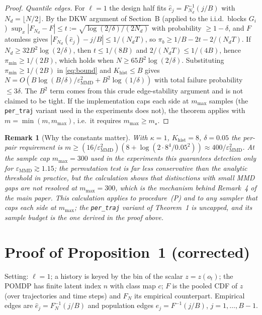 \documentclass[10pt]{article}
\newtheorem{remark}{Remark}[section]
\newcommand{\epsMMD}{\varepsilon_{\mathrm{MMD}}}
\newcommand{\Khist}{K_{\mathrm{hist}}}
\begin{document}
\begin{proof}
\emph{Quantile edges.}  For $\ell=1$ the design half fits $\hat e_j=F_{N_d}^{-1}(j/B)$ with $N_d=\lfloor
N/2\rfloor$.  By the DKW argument of Section~B (applied to the i.i.d.\ blocks
$G_i$) $\sup_x|F_{N_d}-F|\le t:=\sqrt{\log(2/\delta)/(2N_d)}$ with probability
$\ge1-\delta$, and $F$ atomless gives $|F_{N_d}(\hat e_j)-j/B|\le1/(N_dT)$, so
$\pi_b\ge1/B-2t-2/(N_dT)$.  If $N_d\ge32B^2\log(2/\delta)$, then $t\le1/(8B)$ and
$2/(N_dT)\le1/(4B)$, hence $\pi_{\min}\ge1/(2B)$, which holds when $N\ge65B^2\log(2/\delta)$.
Substituting $\pi_{\min}\ge1/(2B)$ in \eqref{eq:bound} and $\Khist\le B$ gives
$N=O(B\log(B/\delta)/\epsMMD^2+B^2\log(1/\delta))$ with total failure probability $\le3\delta$.
The $B^2$ term comes from this crude edge-stability argument and is not claimed to be tight.
If the implementation caps each side at $m_{\max}$ samples (the \texttt{per\_traj}
variant used in the experiments does not), the theorem applies with
$m=\min(m,m_{\max})$, i.e.\ it requires $m_{\max}\ge m_\star$.
\end{proof}

\begin{remark}[Why the constants matter]
With $\kappa=1$, $\Khist=8$, $\delta=0.05$ the per-pair requirement is
$m\ge(16/\epsMMD^2)(8+\log(2\cdot8^4/0.05^2))\approx 400/\epsMMD^2$.  At the
sample cap $m_{\max}=300$ used in the experiments this guarantees detection
only for $\epsMMD\gtrsim1.15$; the permutation test is far less conservative
than the analytic threshold in practice, but the calculation shows that
distinctions with small MMD gaps are \emph{not} resolved at $m_{\max}=300$,
which is the mechanism behind Remark~4 of the main paper.  This calculation
applies to procedure~(P) and to any sampler that caps each side at
$m_{\max}$; the \texttt{per\_traj} variant of Theorem~1 is uncapped, and its
sample budget is the one derived in the proof above.
\end{remark}

\section{Proof of Proposition~1 (corrected)}
\label{sec:proof-prop1}

Setting: $\ell=1$; a history is keyed by the bin of the scalar $z=z(o_t)$;
the POMDP has finite latent index $n$ with class map $c$; $F$ is the pooled
CDF of $z$ (over trajectories and time steps) and $F_N$ its empirical
counterpart.  Empirical edges are $\hat e_j=F_N^{-1}(j/B)$ and population edges
$e_j=F^{-1}(j/B)$, $j=1,\dots,B-1$.
\end{document}
